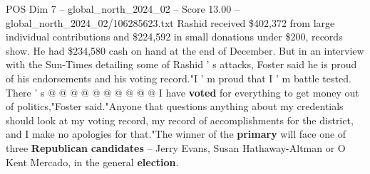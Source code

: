 \begin{textsample}{POS Dim 7 – global\_north\_2024\_02 – Score 13.00 – global\_north\_2024\_02/106285623.txt}
Rashid received \$402,372 from large individual contributions and \$224,592 in small donations under \$200, records show.
He had \$234,580 cash on hand at the end of December.
But in an interview with the Sun-Times detailing some of Rashid ' s attacks, Foster said he is proud of his endorsements and his voting record."I ' m proud that I ' m battle tested.
There ' s @ @ @ @ @ @ @ @ @ @ I have \textbf{voted} for everything to get money out of politics,"Foster said."Anyone that questions anything about my credentials should look at my voting record, my record of accomplishments for the district, and I make no apologies for that."The winner of the \textbf{primary} will face one of three \textbf{Republican} \textbf{candidates} -- Jerry Evans, Susan Hathaway-Altman or O Kent Mercado, in the general \textbf{election}.

\end{textsample}
